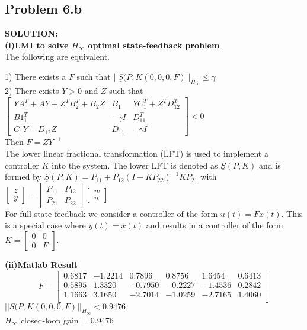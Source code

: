 \documentclass[10pt,a4paper]{article}
\begin{document}
\subsection{Problem 6.b}
\begin{tcolorbox}
\textbf{SOLUTION:}\\
\textbf{(i)LMI to solve $H_\infty$ optimal state-feedback problem}\\
The following are equivalent.

1) There exists a $F$ such that $||\underline{S}(P,K(0,0,0,F)||_{H_{\infty}}\leq \gamma$\\

2) There exists $Y>0$ and $Z$ such that\\

$\begin{bmatrix} YA^T+AY+Z^TB_2^{T}+B_2Z & B_1 & YC^{T}_1 + Z^{T} D^{T}_{12} \\ B1^{T}_1 & -\gamma I & D^{T}_{11} \\ C_1 Y + D_{12} Z & D_{11} & -\gamma I \end{bmatrix}<0
$\\

Then $F=ZY^{-1}$\\

The lower linear fractional transformation (LFT) is used to implement a controller $K$ into the system. The lower LFT is denoted as $\underline{S}(P,K)$ and is formed by $\underline{S}(P,K)=P_{11}+P_{12}(I-KP_{22})^{-1}KP_{21}$ with $\begin{bmatrix} z\\y \end{bmatrix}=\begin{bmatrix} P_{11} & P_{12} \\ P_{21} & P_{22} \end{bmatrix} \begin{bmatrix} w\\u \end{bmatrix}$\\

For full-state feedback we consider a controller of the form $u(t)=Fx(t)$. This is a special case where $y(t)=x(t)$ and results in a controller of the form 
$ K= \begin{bmatrix} 0 & 0 \\ 0 & F \end{bmatrix} $.

\textbf{(ii)Matlab Result}
$$F=\begin{bmatrix}

    0.6817&   -1.2214&    0.7896&    0.8756&    1.6454&    0.6413\\
    0.5895&    1.3320&   -0.7950&   -0.2227&   -1.4536&    0.2842\\
    1.1663&    3.1650&   -2.7014&   -1.0259&   -2.7165&    1.4060\\
    \end{bmatrix}$$
$||\underline{S}(P,K(0,0,0,F)||_{H_{\infty}}< 0.9476$  \\  
$H_\infty$ closed-loop gain = 0.9476\\

\end{tcolorbox}
\end{document}
